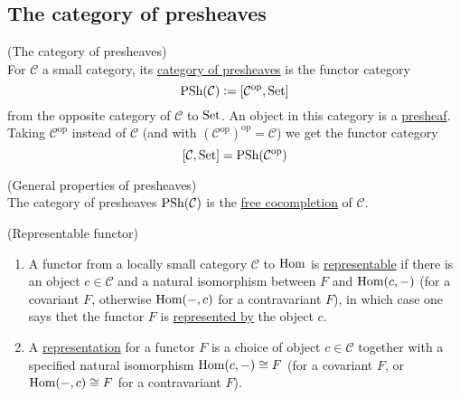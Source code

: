 
\subsection{The category of presheaves}

\begin{definition}{(The category of presheaves)}\\
For $\mathcal{C}$ a small category, its \ul{category of presheaves} is the functor category
\[ \textup{PSh}(\mathcal{C}) := [\mathcal{C}^{\text{op}}, \textup{Set}] \]
from the opposite category of $\mathcal{C}$ to $\textup{Set}$.
An object in this category is a \ul{presheaf}.\\
\noindent Taking $\mathcal{C}^{\text{op}}$ instead of $\mathcal{C}$ (and with $(\mathcal{C}^{\text{op}})^{\text{op}} = \mathcal{C}$) we get the functor category
\[ [\mathcal{C}, \textup{Set}] = \textup{PSh}(\mathcal{C}^{\text{op}}) \]
\end{definition}

\begin{remark}{(General properties of presheaves)}\\
The category of presheaves $\textup{PSh}(\mathcal{C})$ is the \ul{free cocompletion} of $\mathcal{C}$.
\end{remark}

\begin{definition}{(Representable functor)}\label{def:repres_functor}
\begin{enumerate}
\renewcommand{\labelenumi}{(\theenumi)}
\item A functor from a locally small category $\mathcal{C}$ to $\textup{Hom}$ is \ul{representable} if there is an object $c \in \mathcal{C}$ and a
natural isomorphism between $F$ and $\textup{Hom}(c,-)$ (for a covariant $F$, otherwise $\textup{Hom}(-,c)$ for a contravariant $F$), in which case
one says thet the functor $F$ is \ul{represented by} the object $c$.
\item A \ul{representation} for a functor $F$ is a choice of object $c \in \mathcal{C}$ together with a specified natural isomorphism
$\textup{Hom}(c,-) \cong F$ (for a covariant $F$, or $\textup{Hom}(-,c) \cong F$ for a contravariant $F$).
\end{enumerate}
\end{definition}

